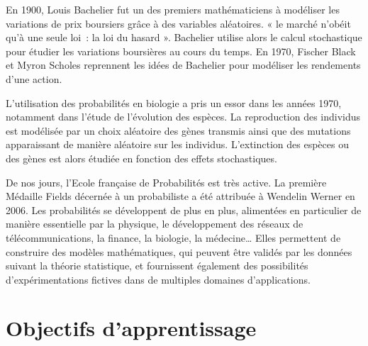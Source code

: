 En 1900, Louis Bachelier fut un des premiers mathématiciens à modéliser
les variations de prix boursiers grâce à des variables aléatoires. « le
marché n'obéit qu'à une seule loi~: la loi du hasard ». Bachelier
utilise alors le calcul stochastique pour étudier les variations
boursières au cours du temps. En 1970, Fischer Black et Myron Scholes
reprennent les idées de Bachelier pour modéliser les rendements d'une
action.

L'utilisation des probabilités en biologie a pris un essor dans les
années 1970, notamment dans l'étude de l'évolution des espèces. La
reproduction des individus est modélisée par un choix aléatoire des
gènes transmis ainsi que des mutations apparaissant de manière aléatoire
sur les individus. L'extinction des espèces ou des gènes est alors
étudiée en fonction des effets stochastiques.

De nos jours, l'Ecole française de Probabilités est très active. La
première Médaille Fields décernée à un probabiliste a été attribuée à
Wendelin Werner en 2006. Les probabilités se développent de plus en
plus, alimentées en particulier de manière essentielle par la physique,
le développement des réseaux de télécommunications, la finance, la
biologie, la médecine\ldots{} Elles permettent de construire des modèles
mathématiques, qui peuvent être validés par les données suivant la
théorie statistique, et fournissent également des possibilités
d'expérimentations fictives dans de multiples domaines d'applications.

\chapter{Objectifs d'apprentissage}\label{I-objectifs-dapprentissage}

\label{I-probabilituxe9s-des-uxe9vuxe9nements}

